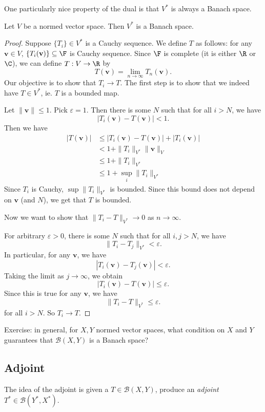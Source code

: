 \documentclass[a4paper]{article}
\begin{document}
One particularly nice property of the dual is that $V^*$ is always a Banach space.

\begin{prop}
  Let $V$ be a normed vector space. Then $V^*$ is a Banach space.
\end{prop}

\begin{proof}
  Suppose $\{T_i\} \in V^*$ is a Cauchy sequence. We define $T$ as follows: for any $\mathbf{v}\in V$, $\{T_i(\mathbf{v})\}\subseteq \F$ is Cauchy sequence. Since $\F$ is complete (it is either $\R$ or $\C$), we can define $T: V\to \R$ by
  \[
    T(\mathbf{v}) = \lim_{n \to \infty}T_n (\mathbf{v}).
  \]
  Our objective is to show that $T_i \to T$. The first step is to show that we indeed have $T \in V^*$, ie. $T$ is a bounded map.

  Let $\|\mathbf{v}\| \leq 1$. Pick $\varepsilon = 1$. Then there is some $N$ such that for all $i > N$, we have
  \[
    |T_i(\mathbf{v}) - T(\mathbf{v})| < 1.
  \]
  Then we have
  \begin{align*}
    |T(\mathbf{v})| &\leq |T_i(\mathbf{v}) - T(\mathbf{v})| + |T_i(\mathbf{v})| \\
    &< 1 + \|T_i\|_{V^*}\|\mathbf{v}\|_V\\
    & \leq 1 + \|T_i\|_{V^*}\\
    &\leq 1 + \sup_i \|T_i\|_{V^*}
  \end{align*}
  Since $T_i$ is Cauchy, $\sup \|T_i\|_{V^*}$ is bounded. Since this bound does not depend on $\mathbf{v}$ (and $N$), we get that $T$ is bounded.

  Now we want to show that $\|T_i - T\|_{V^*} \to 0$ as $n\to \infty$.

  For arbitrary $\varepsilon > 0$, there is some $N$ such that for all $i, j > N$, we have
  \[
    \|T_i - T_j\|_{V^*} < \varepsilon.
  \]
  In particular, for any $\mathbf{v}$, we have
  \[
    |T_i(\mathbf{v}) - T_j(\mathbf{v})| < \varepsilon.
  \]
  Taking the limit as $j\to \infty$, we obtain
  \[
    |T_i(\mathbf{v}) - T(\mathbf{v})| \leq \varepsilon.
  \]
  Since this is true for any $\mathbf{v}$, we have
  \[
    \|T_i - T\|_{V^*} \leq \varepsilon.
  \]
  for all $i > N$. So $T_i \to T$.
\end{proof}
Exercise: in general, for $X, Y$ normed vector spaces, what condition on $X$ and $Y$ guarantees that $\mathcal{B}(X, Y)$ is a Banach space?

\subsection{Adjoint}
The idea of the adjoint is given a $T\in \mathcal{B}(X, Y)$, produce an \emph{adjoint} $T^*\in \mathcal{B}(Y^*, X^*)$.
\end{document}
